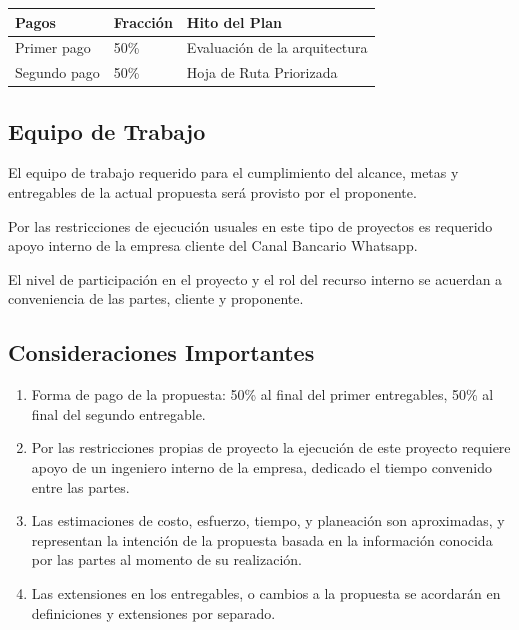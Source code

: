 \documentclass[
  paper=a4,
  ,captions=tableheading
]{scrartcl}
\providecommand{\tightlist}{%
  \setlength{\itemsep}{0pt}\setlength{\parskip}{0pt}}
\renewenvironment{quote}{\begin{customblockquote}\list{}{\rightmargin=0em\leftmargin=0em}%
\item\relax\color{blockquote-text}\ignorespaces}{\unskip\unskip\endlist\end{customblockquote}}
\begin{document}
\begin{longtable}[]{@{}lll@{}}
\toprule\noalign{}
Pagos & Fracción & Hito del Plan \\
\midrule\noalign{}
\endhead
\bottomrule\noalign{}
\endlastfoot
Primer pago & 50\% & Evaluación de la arquitectura \\
Segundo pago & 50\% & Hoja de Ruta Priorizada \\
\end{longtable}

\subsection{Equipo de Trabajo}\label{sec:equipo-de-trabajo}

\begin{quote}
\end{quote}

El equipo de trabajo requerido para el cumplimiento del alcance, metas y
entregables de la actual propuesta será provisto por el proponente.

Por las restricciones de ejecución usuales en este tipo de proyectos es
requerido apoyo interno de la empresa cliente del Canal Bancario
Whatsapp.

El nivel de participación en el proyecto y el rol del recurso interno se
acuerdan a conveniencia de las partes, cliente y proponente.

\subsection{Consideraciones
Importantes}\label{sec:consideraciones-importantes}

\begin{quote}
\end{quote}

\begin{enumerate}
\def\labelenumi{\arabic{enumi}.}
\tightlist
\item
  Forma de pago de la propuesta: 50\% al final del primer entregables,
  50\% al final del segundo entregable.
\item
  Por las restricciones propias de proyecto la ejecución de este
  proyecto requiere apoyo de un ingeniero interno de la empresa,
  dedicado el tiempo convenido entre las partes.
\item
  Las estimaciones de costo, esfuerzo, tiempo, y planeación son
  aproximadas, y representan la intención de la propuesta basada en la
  información conocida por las partes al momento de su realización.
\item
  Las extensiones en los entregables, o cambios a la propuesta se
  acordarán en definiciones y extensiones por separado.
\end{enumerate}
\end{document}
